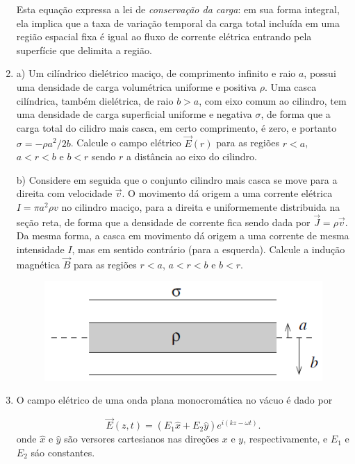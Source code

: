 \begin{enumerate}[start=1,label={\bfseries Q\arabic*.}]
Esta equação expressa a lei de \textit{conservação da carga}: em sua forma integral, ela implica que a taxa de variação temporal da carga total incluída em uma região espacial fixa é igual ao fluxo de corrente elétrica entrando pela superfície que delimita a região.



\item {a)} Um cilíndrico dielétrico maciço, de comprimento infinito e raio $a$, possui uma densidade de carga volumétrica uniforme e positiva $\rho$. Uma casca cilíndrica, também dielétrica, de raio $b > a$, com eixo comum ao cilindro, tem uma densidade de carga superficial uniforme e negativa $\sigma$, de forma que a carga total do cilidro mais casca, em certo comprimento, é zero, e portanto $ \sigma = -\rho a^{2} / 2b$. Calcule o campo elétrico $\vec{E}(r)$ para as regiões $r < a$, $a < r < b$ e $b < r$ sendo $r$ a distância ao eixo do cilindro.


\resposta

b) Considere em seguida que o conjunto cilindro mais casca se move para a direita com velocidade $\vec{v}$. O movimento dá origem a uma corrente elétrica $I = \pi a^{2} \rho v$ no cilindro maciço, para a direita e uniformemente distribuida na seção reta, de forma que a densidade de corrente fica sendo dada por $\vec{J} = \rho \vec{v}$. Da mesma forma, a casca em movimento dá origem a uma corrente de mesma intensidade $I$, mas em sentido contrário (para a esquerda). Calcule a indução magnética $\vec{B}$ para as regiões $r < a$, $a < r < b$ e $b < r$.


\begin{figure}[H]
\centering
\includegraphics[scale=1]{eletromag-img/inducao.png}
\end{figure}



\item O campo elétrico de uma onda plana monocromática no vácuo é dado por

$$
\vec{E}(z,t) = ( E_{1} \hat{x} + E_{2} \hat{y} )e^{i(kz - \omega t)}.
$$
onde $\hat{x}$ e $\hat{y}$ são versores cartesianos nas direções $x$ e $y$, respectivamente, e $E_{1}$ e $E_{2}$ sáo constantes.



\end{enumerate}
